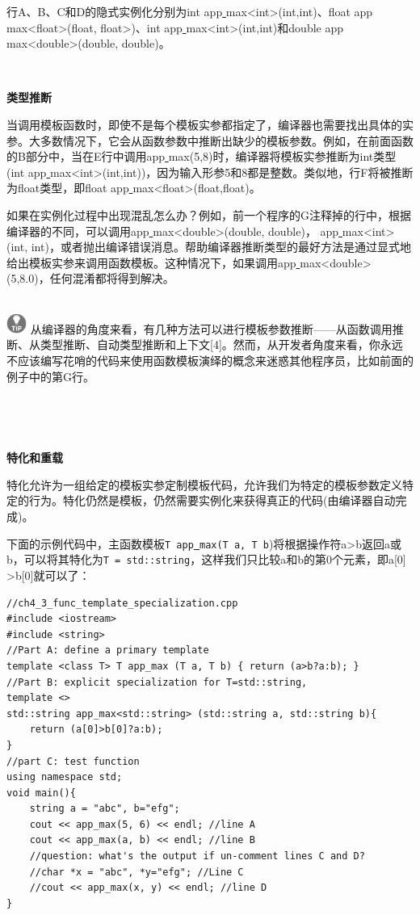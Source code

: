 行A、B、C和D的隐式实例化分别为int app\underline{ }max<int>(int,int)、float app\underline{ }max<float>(float, float>)、int app\underline{ }max<int>(int,int)和double app\underline{ }max<double>(double, double)。 \par

\noindent\textbf{}\ \par
\textbf{类型推断} \ \par
当调用模板函数时，即使不是每个模板实参都指定了，编译器也需要找出具体的实参。大多数情况下，它会从函数参数中推断出缺少的模板参数。例如，在前面函数的B部分中，当在E行中调用app\underline{ }max(5,8)时，编译器将模板实参推断为int类型(int app\underline{ }max<int>(int,int))，因为输入形参5和8都是整数。类似地，行F将被推断为float类型，即float app\underline{ }max<float>(float,float)。 \par
如果在实例化过程中出现混乱怎么办？例如，前一个程序的G注释掉的行中，根据编译器的不同，可以调用app\underline{ }max<double>(double, double)， app\underline{ }max<int>(int, int)，或者抛出编译错误消息。帮助编译器推断类型的最好方法是通过显式地给出模板实参来调用函数模板。这种情况下，如果调用app\underline{ }max<double>(5,8.0)，任何混淆都将得到解决。 \par

\hspace*{\fill} \\ %
\includegraphics[width=0.05\textwidth]{images/tip}
从编译器的角度来看，有几种方法可以进行模板参数推断——从函数调用推断、从类型推断、自动类型推断和上下文[4]。然而，从开发者角度来看，你永远不应该编写花哨的代码来使用函数模板演绎的概念来迷惑其他程序员，比如前面的例子中的第G行。\par
\noindent\textbf{}\ \par

\noindent\textbf{}\ \par
\textbf{特化和重载} \ \par
特化允许为一组给定的模板实参定制模板代码，允许我们为特定的模板参数定义特定的行为。特化仍然是模板，仍然需要实例化来获得真正的代码(由编译器自动完成)。\par
下面的示例代码中，主函数模板\texttt{T app\underline{ }max(T a, T b})将根据操作符a>b返回a或b，可以将其特化为\texttt{T = std::string}，这样我们只比较a和b的第0个元素，即a[0] >b[0]就可以了： \par

\begin{lstlisting}[caption={}]
//ch4_3_func_template_specialization.cpp
#include <iostream>
#include <string>
//Part A: define a primary template
template <class T> T app_max (T a, T b) { return (a>b?a:b); }
//Part B: explicit specialization for T=std::string,
template <>
std::string app_max<std::string> (std::string a, std::string b){
	return (a[0]>b[0]?a:b);
}
//part C: test function
using namespace std;
void main(){
	string a = "abc", b="efg";
	cout << app_max(5, 6) << endl; //line A
	cout << app_max(a, b) << endl; //line B
	//question: what's the output if un-comment lines C and D?
	//char *x = "abc", *y="efg"; //Line C
	//cout << app_max(x, y) << endl; //line D
}
\end{lstlisting}


